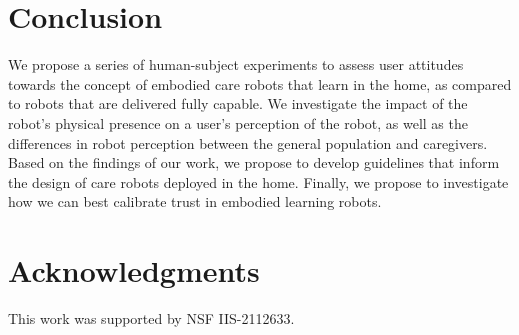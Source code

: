 \documentclass[letterpaper]{article} %
\begin{document}
\section{Conclusion}
\label{sec:conclusion}
We propose a series of human-subject experiments to assess user attitudes towards the concept of embodied care robots that learn in the home, as compared to robots that are delivered fully capable. We investigate the impact of the robot's physical presence on a user's perception of the robot, as well as the differences in robot perception between the general population and caregivers. Based on the findings of our work, we propose to develop guidelines that inform the design of care robots deployed in the home. Finally, we propose to investigate how we can best calibrate trust in embodied learning robots.

\section{Acknowledgments}
This work was supported by NSF IIS-2112633.


\end{document}
